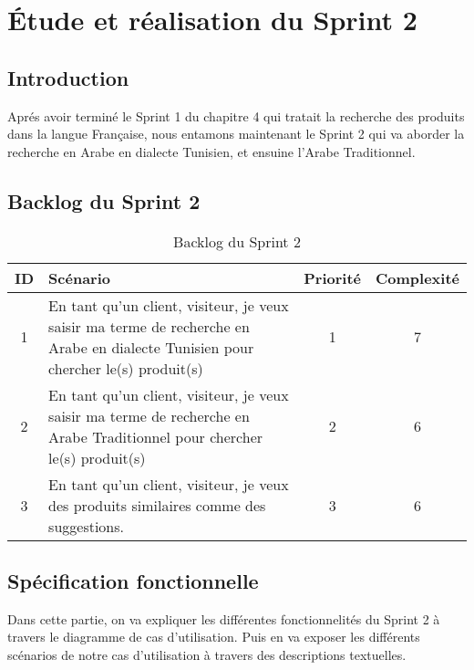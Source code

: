 \chapter{Étude et réalisation du Sprint 2}
\localtableofcontents

\newpage
\section{Introduction}
\noindent
Aprés avoir terminé le Sprint 1 du chapitre 4 qui tratait la recherche des produits dans la langue Française, nous entamons maintenant le Sprint 2 qui va aborder la recherche en Arabe en dialecte Tunisien, et ensuine l'Arabe Traditionnel.

\section{Backlog du Sprint 2}
\begin{table}[H]
	\centering

	\begin{tabularx}{\textwidth}{|c|X|c|c|}
		\hline
		\rowcolor{blue!20}
		\textbf{ID} & \textbf{Scénario}                                                                                     & \textbf{Priorité} & \textbf{Complexité} \\ \hline
		1           & En tant qu'un client, visiteur, je veux saisir ma terme de recherche en Arabe en dialecte Tunisien pour chercher le(s) produit(s) & 1                 & 7                  \\ \hline

	2           & En tant qu'un client, visiteur, je veux saisir ma terme de recherche en Arabe Traditionnel pour chercher le(s) produit(s) & 2                 & 6 \\ \hline
	3           & En tant qu'un client, visiteur, je veux des produits similaires comme des suggestions. & 3                 & 6 \\ \hline
	\end{tabularx}
	\caption{Backlog du Sprint 2}
	\label{tab:sprint2}
\end{table}

\section{Spécification fonctionnelle}
\noindent
Dans cette partie, on va expliquer les différentes fonctionnelités du Sprint 2 à travers le diagramme de cas d'utilisation. Puis en va exposer les différents scénarios de notre cas d'utilisation à travers des descriptions textuelles.



